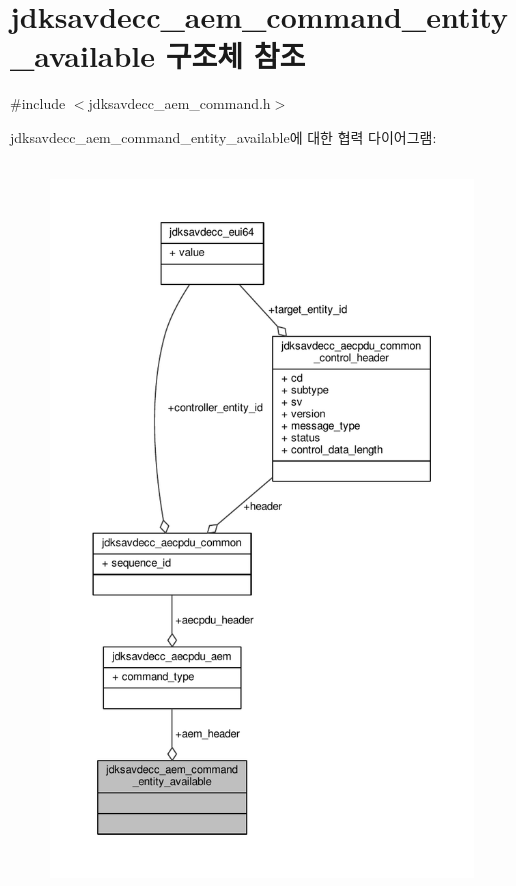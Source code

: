\hypertarget{structjdksavdecc__aem__command__entity__available}{}\section{jdksavdecc\+\_\+aem\+\_\+command\+\_\+entity\+\_\+available 구조체 참조}
\label{structjdksavdecc__aem__command__entity__available}


{\ttfamily \#include $<$jdksavdecc\+\_\+aem\+\_\+command.\+h$>$}



jdksavdecc\+\_\+aem\+\_\+command\+\_\+entity\+\_\+available에 대한 협력 다이어그램\+:
\nopagebreak
\begin{figure}[H]
\begin{center}
\leavevmode
\includegraphics[height=550pt]{structjdksavdecc__aem__command__entity__available__coll__graph}
\end{center}
\end{figure}
